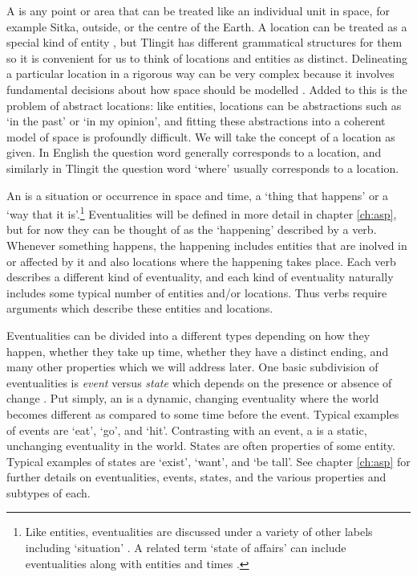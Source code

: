 A  is any point or area that can be treated like an individual unit in space, for example Sitka, outside, or the centre of the Earth. A location can be treated as a special kind of entity \parencite{gilmore:2018}, but Tlingit has different grammatical structures for them so it is convenient for us to think of locations and entities as distinct. Delineating a particular location in a rigorous way can be very complex because it involves fundamental decisions about how space should be modelled \parencites{pederson:2012}{landau:2012}{gilmore:2018}. Added to this is the problem of abstract locations: like entities, locations can be abstractions such as ‘in the past’ or ‘in my opinion’, and fitting these abstractions into a coherent model of space is profoundly difficult. We will take the concept of a location as given. In English the question word  generally corresponds to a location, and similarly in Tlingit the question word  ‘where’ usually corresponds to a location.

An  is a situation or occurrence in space and time, a ‘thing that happens’ or a ‘way that it is’.\footnote{Like entities, eventualities are discussed under a variety of other labels including ‘situation’ \parencites{binnick:1991}{smith:1997}{kratzer:2019}. A related term ‘state of affairs’ can include eventualities along with entities and times \parencites{binnick:1991}{textor:2016}{kratzer:2019}.} Eventualities will be defined in more detail in chapter \ref{ch:asp}, but for now they can be thought of as the ‘happening’ described by a verb. Whenever something happens, the happening includes entities that are inolved in or affected by it and also locations where the happening takes place. Each verb describes a different kind of eventuality, and each kind of eventuality naturally includes some typical number of entities and/or locations. Thus verbs require arguments which describe these entities and locations.

Eventualities can be divided into a different types depending on how they happen, whether they take up time, whether they have a distinct ending, and many other properties which we will address later. One basic subdivision of eventualities is \emph{event} versus \emph{state} which depends on the presence or absence of change \parencites{bach:1986}{higginbotham:2000}{maienborn:2011}{zucchi:2015}. Put simply, an  is a dynamic, changing eventuality where the world becomes different as compared to some time before the event. Typical examples of events are ‘eat’, ‘go’, and ‘hit’. Contrasting with an event, a  is a static, unchanging eventuality in the world. States are often properties of some entity. Typical examples of states are ‘exist’, ‘want’, and ‘be tall’.  See chapter \ref{ch:asp} for further details on eventualities, events, states, and the various properties and subtypes of each.

